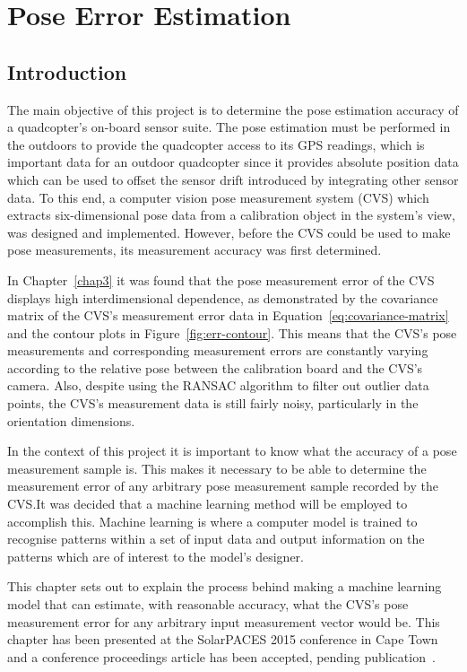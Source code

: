 \chapter{Pose Error Estimation}
\label{chap4}

\section{Introduction}

The main objective of this project is to determine the pose estimation accuracy of a quadcopter's on-board sensor suite. The pose estimation must be performed in the outdoors to provide the quadcopter access to its GPS readings, which is important data for an outdoor quadcopter since it provides absolute position data which can be used to offset the sensor drift introduced by integrating other sensor data. To this end, a computer vision pose measurement system (CVS) which extracts six-dimensional pose data from a calibration object in the system's view, was designed and implemented. However, before the CVS could be used to make pose measurements, its measurement accuracy was first determined. 

In Chapter~\ref{chap3} it was found that the pose measurement error of the CVS displays high interdimensional dependence, as demonstrated by the covariance matrix of the CVS's measurement error data in Equation~\ref{eq:covariance-matrix} and the contour plots in Figure~\ref{fig:err-contour}. This means that the CVS's pose measurements and corresponding measurement errors are constantly varying according to the relative pose between the calibration board and the CVS's camera. Also, despite using the RANSAC algorithm to filter out outlier data points, the CVS's measurement data is still fairly noisy, particularly in the orientation dimensions.

In the context of this project it is important to know what the accuracy of a pose measurement sample is. This makes it necessary to be able to determine the measurement error of any arbitrary pose measurement sample recorded by the CVS.\@ It was decided that a machine learning method will be employed to accomplish this. Machine learning is where a computer model is trained to recognise patterns within a set of input data and output information on the patterns which are of interest to the model's designer. 

This chapter sets out to explain the process behind making a machine learning model that can estimate, with reasonable accuracy, what the CVS's pose measurement error for any arbitrary input measurement vector would be. This chapter has been presented at the SolarPACES 2015 conference in Cape Town and a conference proceedings article has been accepted, pending publication~\citep{lock2015}. 

